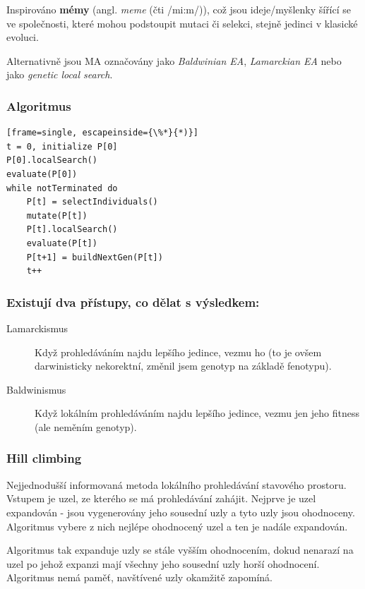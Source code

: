 Inspirováno \textbf{mémy} (angl. \textit{meme} (čti /mi:m/)), což jsou ideje/myšlenky šířící se ve společnosti, které mohou podstoupit mutaci či selekci, stejně jedinci v klasické evoluci. 

Alternativně jsou MA označovány jako \textit{Baldwinian EA}, \textit{Lamarckian EA} nebo jako \textit{genetic local search}.

\subsubsection{Algoritmus}
\begin{minipage}{\linewidth}
	\begin{lstlisting}[frame=single, escapeinside={\%*}{*)}]
t = 0, initialize P[0]
P[0].localSearch()
evaluate(P[0])
while notTerminated do
	P[t] = selectIndividuals()
	mutate(P[t])
	P[t].localSearch()
	evaluate(P[t])
	P[t+1] = buildNextGen(P[t])
	t++

	\end{lstlisting}
\end{minipage}

\subsubsection{Existují dva přístupy, co dělat s výsledkem:}
\begin{description}
	
	
	\item[Lamarckismus] Když prohledáváním najdu lepšího jedince, vezmu ho (to je ovšem darwinisticky nekorektní, změnil jsem genotyp na základě fenotypu).
	\item[Baldwinismus] Když lokálním prohledáváním najdu lepšího jedince, vezmu jen jeho fitness (ale neměním genotyp).
\end{description}


\subsubsection{Hill climbing}
Nejjednodušší informovaná metoda lokálního prohledávání stavového prostoru. Vstupem je uzel, ze kterého se má prohledávání zahájit. Nejprve je uzel expandován - jsou vygenerovány jeho sousední uzly a tyto uzly jsou ohodnoceny. Algoritmus vybere z nich nejlépe ohodnocený uzel a ten je nadále expandován. 

Algoritmus tak expanduje uzly se stále vyšším ohodnocením, dokud nenarazí na uzel po jehož expanzi mají všechny jeho sousední uzly horší ohodnocení. Algoritmus nemá paměť, navštívené uzly okamžitě zapomíná.

